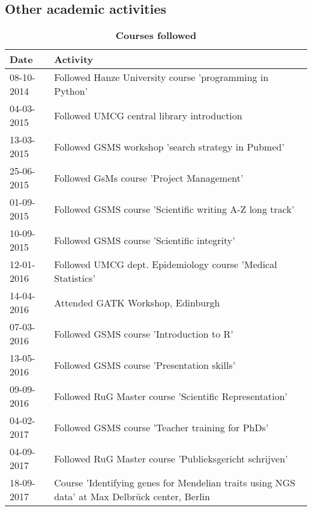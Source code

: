 \begin{appendices}
	\chapter{Other academic activities}
	
	\begin{table}
	\caption*{\textbf{Courses followed}}
		\footnotesize
		\begin{tabulary}{\linewidth}{LL}
			Date & Activity \\
			\hline
			\rule{0pt}{2.5ex}\mbox{08-10-2014} & Followed Hanze University course 'programming in Python'  \\
			\rule{0pt}{2.5ex}\mbox{04-03-2015} & Followed UMCG central library introduction \\
			\rule{0pt}{2.5ex}\mbox{13-03-2015} & Followed GSMS workshop 'search strategy in Pubmed'\\
			\rule{0pt}{2.5ex}\mbox{25-06-2015} & Followed GsMs course 'Project Management' \\
			\rule{0pt}{2.5ex}\mbox{01-09-2015} & Followed GSMS course 'Scientific writing A-Z long track' \\
			\rule{0pt}{2.5ex}\mbox{10-09-2015} & Followed GSMS course 'Scientific integrity'\\
			\rule{0pt}{2.5ex}\mbox{12-01-2016} & Followed UMCG dept. Epidemiology course 'Medical Statistics'\\
			\rule{0pt}{2.5ex}\mbox{14-04-2016} & Attended GATK Workshop, Edinburgh\\
			\rule{0pt}{2.5ex}\mbox{07-03-2016} & Followed GSMS course 'Introduction to R'\\
			\rule{0pt}{2.5ex}\mbox{13-05-2016} & Followed GSMS course 'Presentation skills'\\
			\rule{0pt}{2.5ex}\mbox{09-09-2016} & Followed RuG Master course 'Scientific Representation'\\
			\rule{0pt}{2.5ex}\mbox{04-02-2017} & Followed GSMS course 'Teacher training for PhDs'\\
			\rule{0pt}{2.5ex}\mbox{04-09-2017} & Followed RuG Master course 'Publieksgericht schrijven'\\
			\rule{0pt}{2.5ex}\mbox{18-09-2017} & Course 'Identifying genes for Mendelian traits using NGS data' at Max Delbrück center, Berlin\\
			\hline
		\end{tabulary}
\label{table:appendix_activities_1}
\end{table}			
			


\end{appendices}
